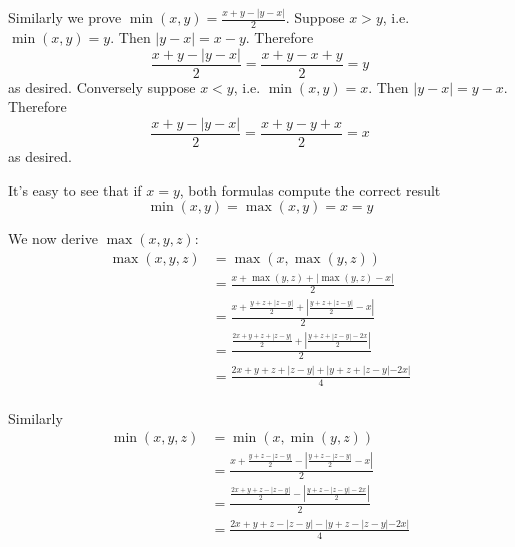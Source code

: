 \vs

Similarly we prove $\min(x,y)=\frac{x+y-|y-x|}{2}$. Suppose $x>y$, i.e. $\min(x,y)=y$. Then $|y-x|=x-y$. Therefore
\[\frac{x+y-|y-x|}{2}=\frac{x+y-x+y}{2}=y\]
as desired. Conversely suppose $x<y$, i.e. $\min(x,y)=x$. Then $|y-x|=y-x$. Therefore
\[\frac{x+y-|y-x|}{2}=\frac{x+y-y+x}{2}=x\]
as desired.

\vs

It's easy to see that if $x=y$, both formulas compute the correct result
\[\min(x,y)=\max(x,y)=x=y\]

\vs

We now derive $\max(x,y,z)$:
\begin{align*}
    \max(x,y,z)&=\max(x, \max(y, z))\\
    &=\frac{x+\max(y,z)+|\max(y,z)-x|}{2}\\
    &=\frac{x+\frac{y+z+|z-y|}{2}+|\frac{y+z+|z-y|}{2}-x|}{2}\\
    &=\frac{\frac{2x+y+z+|z-y|}{2}+|\frac{y+z+|z-y|-2x}{2}|}{2}\\
    &=\frac{2x+y+z+|z-y|+|y+z+|z-y|-2x|}{4}\\
\end{align*}

Similarly
\begin{align*}
    \min(x,y,z)&=\min(x,\min(y,z))\\
    &=\frac{x+\frac{y+z-|z-y|}{2}-|\frac{y+z-|z-y|}{2}-x|}{2}\\
    &=\frac{\frac{2x+y+z-|z-y|}{2}-|\frac{y+z-|z-y|-2x}{2}|}{2}\\
    &=\frac{2x+y+z-|z-y|-|y+z-|z-y|-2x|}{4}
\end{align*}

